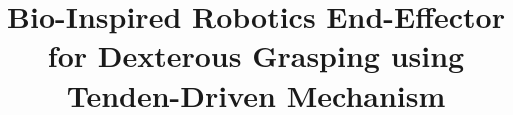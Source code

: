 \documentclass[conference]{IEEEtran}
\begin{document}
%
\title{Bio-Inspired Robotics End-Effector for Dexterous Grasping using Tenden-Driven Mechanism}  




% 








\maketitle
\end{document}
